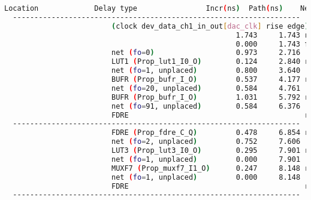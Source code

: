 \documentclass{article}
\begin{document}
\begin{lstlisting}[language=bash]
    Location             Delay type                Incr(ns)  Path(ns)    Netlist Resource(s)
  -------------------------------------------------------------------    -------------------
                         (clock dev_data_ch1_in_out[dac_clk] rise edge)
                                                      1.743     1.743 r  
                                                      0.000     1.743 f  dev_data_clk_in[DATA_CLK_P] (IN)
                         net (fo=0)                   0.973     2.716    worker/dev_data_clk_in[DATA_CLK_P]
                         LUT1 (Prop_lut1_I0_O)        0.124     2.840 r  worker/dac_clk_bufr_i_1/O
                         net (fo=1, unplaced)         0.800     3.640    worker/dac_dev_data_clk_p
                         BUFR (Prop_bufr_I_O)         0.537     4.177 r  worker/dac_clk_bufr/O
                         net (fo=20, unplaced)        0.584     4.761    worker/dac_clk
                         BUFR (Prop_bufr_I_O)         1.031     5.792 r  worker/BUFR_inst/O
                         net (fo=91, unplaced)        0.584     6.376    worker/dev_data_ch1_in_out[dac_clk]
                         FDRE                                         r  worker/data_mode_lvds.reg_duplication_loop[6].dacd2_ch0_i_r_reg[6]/C
  -------------------------------------------------------------------    -------------------
                         FDRE (Prop_fdre_C_Q)         0.478     6.854 r  worker/data_mode_lvds.reg_duplication_loop[6].dacd2_ch0_i_r_reg[6]/Q
                         net (fo=2, unplaced)         0.752     7.606    worker/data_mode_lvds.reg_duplication_loop[6].dacd2_ch0_i_r_reg_n_0_[6]
                         LUT3 (Prop_lut3_I0_O)        0.295     7.901 r  worker/data_mode_lvds.dac_data_ddr_first_r[0]_i_3/O
                         net (fo=1, unplaced)         0.000     7.901    worker/dacd2_i_r__0[6]
                         MUXF7 (Prop_muxf7_I1_O)      0.247     8.148 r  worker/data_mode_lvds.dac_data_ddr_first_r_reg[0]_i_1/O
                         net (fo=1, unplaced)         0.000     8.148    worker/data_mode_lvds.dac_data_ddr_first_r_reg[0]_i_1_n_0
                         FDRE                                         r  worker/data_mode_lvds.dac_data_ddr_first_r_reg[0]/D
  -------------------------------------------------------------------    -------------------


\end{lstlisting}
\end{document}
